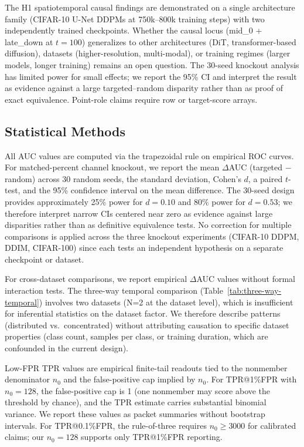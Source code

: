 \documentclass[10pt,conference]{IEEEtran}
\begin{document}
The H1 spatiotemporal causal findings are demonstrated on a single
architecture family (CIFAR-10 U-Net DDPMs at 750k--800k training steps)
with two independently trained checkpoints. Whether the causal locus
(mid\_0 + late\_down at $t{=}100$) generalizes to other architectures
(DiT, transformer-based diffusion), datasets (higher-resolution, multi-modal),
or training regimes (larger models, longer training) remains an open question.
The 30-seed knockout analysis has limited power for small effects; we report
the 95\% CI and interpret the result as evidence against a large
targeted--random disparity rather than as proof of exact equivalence.
Point-role claims require row or target-score arrays.

\subsection{Statistical Methods}

All AUC values are computed via the trapezoidal rule on empirical ROC curves.
For matched-percent channel knockout, we report the mean $\Delta$AUC
(targeted $-$ random) across 30 random seeds, the standard deviation, Cohen's
$d$, a paired $t$-test, and the 95\% confidence interval on the mean
difference. The 30-seed design provides approximately 25\% power for
$d{=}0.10$ and 80\% power for $d{=}0.53$; we therefore interpret
narrow CIs centered near zero as evidence against large disparities rather
than as definitive equivalence tests. No correction for multiple comparisons
is applied across the three knockout experiments (CIFAR-10 DDPM, DDIM,
CIFAR-100) since each tests an independent hypothesis on a separate
checkpoint or dataset.

For cross-dataset comparisons, we report empirical $\Delta$AUC values without
formal interaction tests. The three-way temporal comparison (Table~\ref{tab:three-way-temporal}) involves two datasets (N=2 at the dataset level), which is insufficient
for inferential statistics on the dataset factor. We therefore describe
patterns (distributed vs.\ concentrated) without attributing causation to
specific dataset properties (class count, samples per class, or training
duration, which are confounded in the current design).

Low-FPR TPR values are empirical finite-tail readouts tied to the nonmember
denominator $n_0$ and the false-positive cap implied by $n_0$. For
TPR@1\%FPR with $n_0{=}128$, the false-positive cap is 1 (one nonmember may
score above the threshold by chance), and the TPR estimate carries
substantial binomial variance. We report these values as packet summaries
without bootstrap intervals. For TPR@0.1\%FPR, the rule-of-three requires
$n_0{\geq}3000$ for calibrated claims; our $n_0{=}128$ supports only
TPR@1\%FPR reporting.
\end{document}
